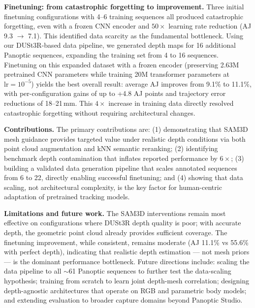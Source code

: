 \documentclass[12pt, a4paper, oneside]{report}
\begin{document}
\textbf{Finetuning: from catastrophic forgetting to improvement.} Three initial finetuning configurations with 4--6 training sequences all produced catastrophic forgetting, even with a frozen CNN encoder and $50\times$ learning rate reduction (AJ 9.3 $\to$ 7.1). This identified data scarcity as the fundamental bottleneck. Using our DUSt3R-based data pipeline, we generated depth maps for 16 additional Panoptic sequences, expanding the training set from 4 to 16 sequences. Finetuning on this expanded dataset with a frozen encoder (preserving 2.63M pretrained CNN parameters while training 20M transformer parameters at $\text{lr} = 10^{-5}$) yields the best overall result: average AJ improves from 9.1\% to 11.1\%, with per-configuration gains of up to +4.8 AJ points and trajectory error reductions of 18--21\,mm. This $4\times$ increase in training data directly resolved catastrophic forgetting without requiring architectural changes.

\textbf{Contributions.} The primary contributions are: (1) demonstrating that SAM3D mesh guidance provides targeted value under realistic depth conditions via both point cloud augmentation and kNN semantic reranking; (2) identifying benchmark depth contamination that inflates reported performance by $6\times$; (3) building a validated data generation pipeline that scales annotated sequences from 6 to 22, directly enabling successful finetuning; and (4) showing that data scaling, not architectural complexity, is the key factor for human-centric adaptation of pretrained tracking models.

\textbf{Limitations and future work.} The SAM3D interventions remain most effective on configurations where DUSt3R depth quality is poor; with accurate depth, the geometric point cloud already provides sufficient coverage. The finetuning improvement, while consistent, remains moderate (AJ 11.1\% vs 55.6\% with perfect depth), indicating that realistic depth estimation --- not mesh priors --- is the dominant performance bottleneck. Future directions include: scaling the data pipeline to all $\sim$61 Panoptic sequences to further test the data-scaling hypothesis; training from scratch to learn joint depth-mesh correlation; designing depth-agnostic architectures that operate on RGB and parametric body models; and extending evaluation to broader capture domains beyond Panoptic Studio.



\end{document}
